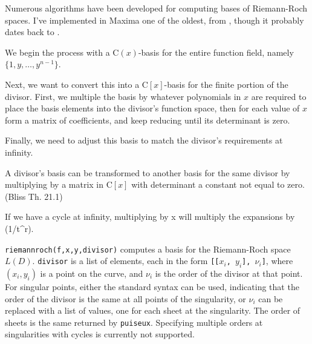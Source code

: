 Numerous algorithms have been developed for computing bases of
Riemann-Roch spaces.  I've implemented in Maxima one of the oldest,
from \cite{bliss}, though it probably dates back
to \cite{dedekind-weber}.

We begin the process with a ${\mathrm C}(x)$-basis for the entire
function field, namely $\{1, y, \ldots, y^{n-1}\}$.

Next, we want to convert this into a ${\mathrm C}[x]$-basis for the
finite portion of the divisor.  First, we multiple the basis by
whatever polynomials in $x$ are required to place the basis elements
into the divisor's function space, then for each value of $x$ form
a matrix of coefficients, and keep reducing until its determinant is zero.

Finally, we need to adjust this basis to match the divisor's requirements at infinity.

A divisor's basis can be transformed to another basis for the same
divisor by multiplying by a matrix in ${\mathrm C}[x]$ with
determinant a constant not equal to zero. (Bliss Th. 21.1)

If we have a cycle at infinity, multiplying by x will multiply
the expansions by (1/t^r).

{\tt riemannroch(f,x,y,divisor)} computes a basis for the Riemann-Roch
space $L(D)$.  {\tt divisor} is a list of elements, each in the form
{\tt [[$x_i$, $y_i$], $\nu_i$]}, where $(x_i, y_i)$ is a point on the
curve, and $\nu_i$ is the order of the divisor at that point.  For
singular points, either the standard syntax can be used, indicating
that the order of the divisor is the same at all points of the
singularity, or $\nu_i$ can be replaced with a list of values, one for
each sheet at the singularity.  The order of sheets is the same
returned by {\tt puiseux}.  Specifying multiple orders at
singularities with cycles is currently not supported.

